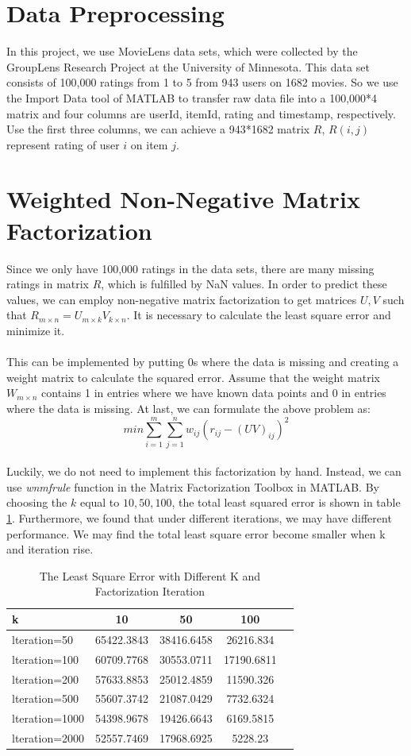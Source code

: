 \documentclass{article}
\begin{document}
\section{Data Preprocessing}
In this project, we use MovieLens data sets, which were collected by the GroupLens Research Project at the University of Minnesota. This data set consists of 100,000 ratings from 1 to 5 from 943 users on 1682 movies. So we use the Import Data tool of MATLAB to transfer raw data file into a 100,000*4 matrix and four columns are userId, itemId, rating and timestamp, respectively. Use the first three columns, we can achieve a 943*1682 matrix $R$, $R(i,j)$ represent rating of user $i$ on item $j$.

\section{Weighted Non-Negative Matrix Factorization}
Since we only have 100,000 ratings in the data sets, there are many missing ratings in matrix $R$, which is fulfilled by NaN values. In order to predict these values, we can employ non-negative matrix factorization to get matrices $U, V$ such that $R_{m \times n}=U_{m \times k}V_{k \times n}$. It is necessary to calculate the least square error and minimize it.\\
\\
This can be implemented by putting 0s where the data is missing and creating a weight matrix to calculate the squared error. Assume that the weight matrix $W_{m \times n}$ contains 1 in entries where we have known data points and 0 in entries where the data is missing. At last, we can formulate the above problem as:
\begin{equation*}
min\sum_{i=1}^{m}\sum_{j=1}^{n}w_{ij}{(r_{ij}-{(UV)}_{ij})}^2
\end{equation*}
\\
Luckily, we do not need to implement this factorization by hand. Instead, we can use \emph{wnmfrule} function in the Matrix Factorization Toolbox in MATLAB. By choosing the $k$ equal to $10, 50, 100$, the total least squared error is shown in table \ref{tb:k}. Furthermore, we found that under different iterations, we may have different performance. We may find the total least square error become smaller when k and iteration rise.
\begin{table}
\begin{center}
\caption{The Least Square Error with Different K and Factorization Iteration}
\label{tb:k}
\begin{tabular}{|l||c|c|c|c|}
\hline
k& 10& 50 & 100\\
\hline
lteration=50&65422.3843&38416.6458&26216.834\\
lteration=100&60709.7768&30553.0711&17190.6811\\
lteration=200&57633.8853&25012.4859&11590.326\\
lteration=500&55607.3742&21087.0429&7732.6324\\
lteration=1000&54398.9678&19426.6643&6169.5815\\
lteration=2000&52557.7469&17968.6925&5228.23\\
\hline
\end{tabular}
\end{center}
\end{table}
\end{document}
